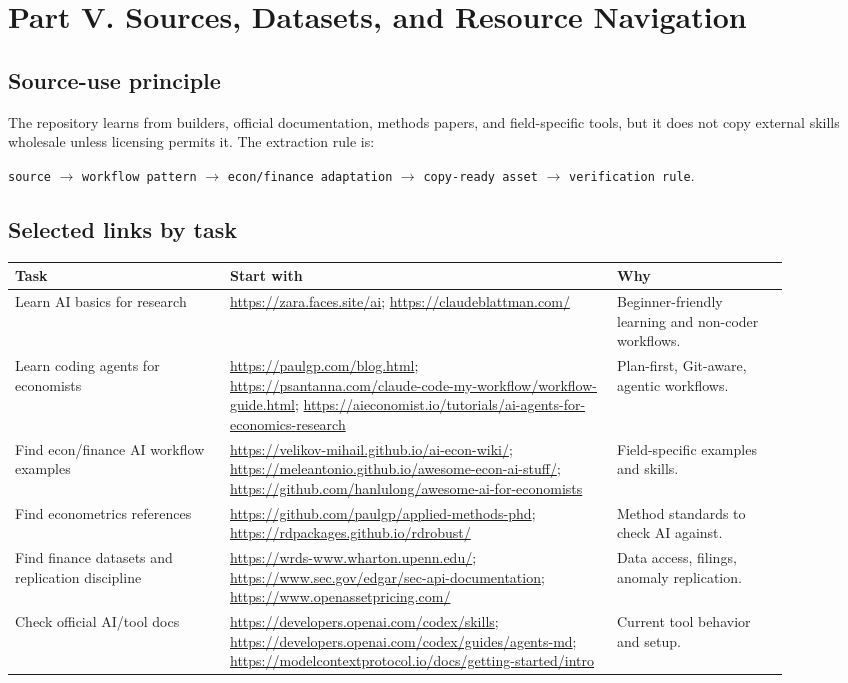 \documentclass[11pt]{article}
\begin{document}
\section{Part V. Sources, Datasets, and Resource Navigation}

\subsection{Source-use principle}

The repository learns from builders, official documentation, methods papers, and field-specific tools, but it does not copy external skills wholesale unless licensing permits it. The extraction rule is:

\begin{center}
\texttt{source} \(\rightarrow\) \texttt{workflow pattern} \(\rightarrow\) \texttt{econ/finance adaptation} \(\rightarrow\) \texttt{copy-ready asset} \(\rightarrow\) \texttt{verification rule}.
\end{center}

\subsection{Selected links by task}

\begin{longtable}{p{0.25\linewidth}p{0.45\linewidth}p{0.20\linewidth}}
\toprule
\textbf{Task} & \textbf{Start with} & \textbf{Why}\\
\midrule
Learn AI basics for research & \url{https://zara.faces.site/ai}; \url{https://claudeblattman.com/} & Beginner-friendly learning and non-coder workflows.\\
Learn coding agents for economists & \url{https://paulgp.com/blog.html}; \url{https://psantanna.com/claude-code-my-workflow/workflow-guide.html}; \url{https://aieconomist.io/tutorials/ai-agents-for-economics-research} & Plan-first, Git-aware, agentic workflows.\\
Find econ/finance AI workflow examples & \url{https://velikov-mihail.github.io/ai-econ-wiki/}; \url{https://meleantonio.github.io/awesome-econ-ai-stuff/}; \url{https://github.com/hanlulong/awesome-ai-for-economists} & Field-specific examples and skills.\\
Find econometrics references & \url{https://github.com/paulgp/applied-methods-phd}; \url{https://rdpackages.github.io/rdrobust/} & Method standards to check AI against.\\
Find finance datasets and replication discipline & \url{https://wrds-www.wharton.upenn.edu/}; \url{https://www.sec.gov/edgar/sec-api-documentation}; \url{https://www.openassetpricing.com/} & Data access, filings, anomaly replication.\\
Check official AI/tool docs & \url{https://developers.openai.com/codex/skills}; \url{https://developers.openai.com/codex/guides/agents-md}; \url{https://modelcontextprotocol.io/docs/getting-started/intro} & Current tool behavior and setup.\\
\bottomrule
\end{longtable}
\end{document}
